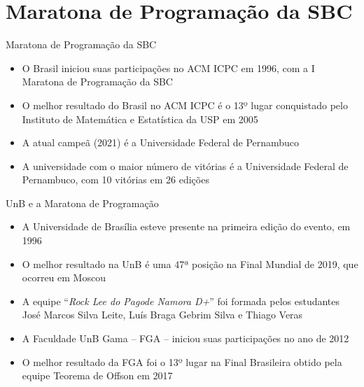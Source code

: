 \section{Maratona de Programação da SBC}

\begin{frame}[fragile]{Maratona de Programação da SBC}

    \begin{itemize}
        \item O Brasil iniciou suas participações no ACM ICPC em 1996, com a I Maratona de
            Programação da SBC
        \item O melhor resultado do Brasil no ACM ICPC é o 13º lugar conquistado pelo 
            Instituto de Matemática e Estatística da USP em 2005
        \item A atual campeã (2021) é a Universidade Federal de Pernambuco
        \item A universidade com o maior número de vitórias é a Universidade Federal de
            Pernambuco, com 10 vitórias em 26 edições
    \end{itemize}

\end{frame}

\begin{frame}[fragile]{UnB e a Maratona de Programação}

    \begin{itemize}
        \item A Universidade de Brasília esteve presente na primeira edição do evento, em 1996
        \item O melhor resultado na UnB é uma 47ª posição na Final Mundial de 2019, que ocorreu
            em Moscou

        \item A equipe ``\textit{Rock Lee do Pagode Namora D+}'' foi formada pelos estudantes José Marcos 
            Silva Leite, Luís Braga Gebrim Silva e Thiago Veras

        \item A Faculdade UnB Gama -- FGA -- iniciou suas participações no ano de 2012
        \item O melhor resultado da FGA foi o 13º lugar na Final Brasileira obtido pela equipe 
            Teorema de Offson em 2017
    \end{itemize}

\end{frame}
